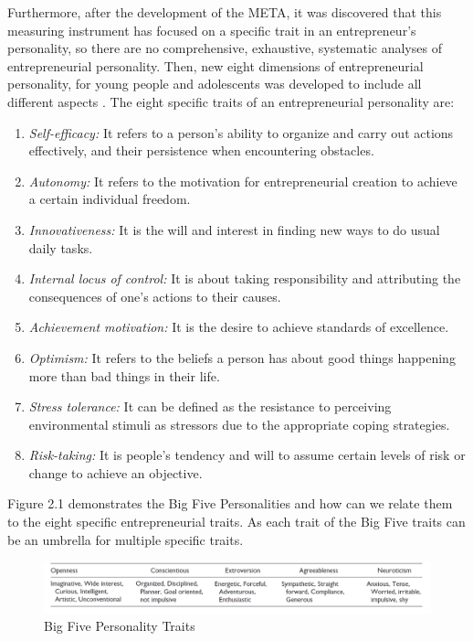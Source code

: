 Furthermore, after the development of the META, it was discovered that this measuring instrument has focused on a specific trait in an entrepreneur's personality, so there are no comprehensive, exhaustive, systematic analyses of entrepreneurial personality. Then, new eight dimensions of entrepreneurial personality, for young people and adolescents was developed to include all different aspects \cite{suarez2014screening}. The eight specific traits of an entrepreneurial personality are: 
\begin{enumerate}
\item \textit{Self-efficacy:} 
It refers to a person's ability to organize and carry out actions effectively, and their persistence when encountering obstacles.
\item \textit{Autonomy:}
It refers to the motivation for entrepreneurial creation to achieve a certain individual freedom.
\item \textit{Innovativeness:}
It is the will and interest in finding new ways to do usual daily tasks.
\item \textit{Internal locus of control:}
It is about taking responsibility and attributing the consequences of one's actions to their causes.
\item \textit{Achievement motivation:}
It is the desire to achieve standards of excellence.
\item \textit{Optimism:}
It refers to the beliefs a person has about good things happening more than bad things in their life.
\item \textit{Stress tolerance:}
It can be defined as the resistance to perceiving environmental stimuli as stressors due to the appropriate coping strategies.
\item \textit{Risk-taking:}
It is people's tendency and will to assume certain levels of risk or change to achieve an objective.
\end{enumerate}

Figure 2.1 demonstrates the Big Five Personalities and how can we relate them to the eight specific entrepreneurial traits. As each trait of the Big Five traits can be an umbrella for multiple specific traits. 

\begin{figure}[H]
\centering
\includegraphics[width=17cm]{Figure1}
\caption{Big Five Personality Traits}
\end{figure}

